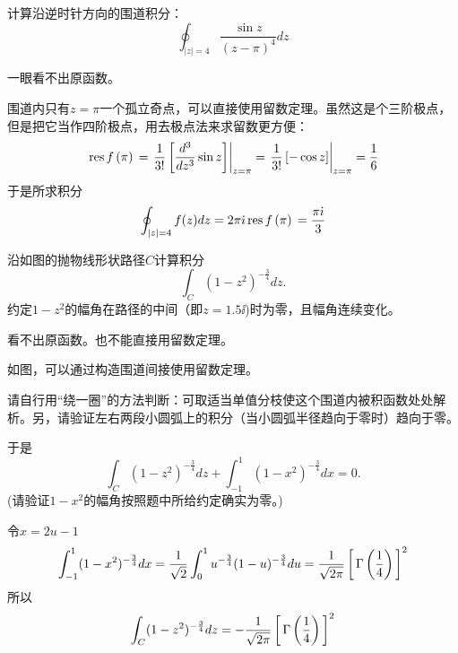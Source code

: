 \documentclass[CJK]{beamer}
\begin{document}

\begin{frame}
\chtitle{\proid (\stwo)}
\bch
计算沿逆时针方向的围道积分：
$$\oint_{|z|=4}\frac{\sin z}{(z-\pi)^4}dz$$
\ech
\end{frame}

\begin{frame}
\bch
一眼看不出原函数。

围道内只有$z=\pi$一个孤立奇点，可以直接使用留数定理。虽然这是个三阶极点，但是把它当作四阶极点，用去极点法来求留数更方便：
$$\,\mathrm{res}\,f\left(\pi\right)\, = \left.\frac{1}{3!}\left[\frac{d^3}{dz^3} \sin z\right] \right\vert_{z=\pi} = \left.\frac{1}{3!}\left[-\cos z\right] \right\vert_{z=\pi} = \frac{1}{6} $$
于是所求积分
$$\oint_{|z|=4}f(z) dz = 2\pi{\dot{\imath}} \,\mathrm{res}\,f\left(\pi\right)\, = \frac{\pi {\dot{\imath}}}{3}$$

\ech
\end{frame}

\begin{frame}
\chtitle{\proid (\sthree)}
\bch
{}

沿如图的抛物线形状路径$C$计算积分
$$\int_C (1-z^2)^{-\frac{3}{4}} dz. $$
约定$1-z^2$的幅角在路径的中间（即$z=1.5\ii$)时为零，且幅角连续变化。
\ech
\end{frame}


\begin{frame}
\bch

看不出原函数。也不能直接用留数定理。


如图，可以通过构造围道间接使用留数定理。

请自行用“绕一圈”的方法判断：可取适当单值分枝使这个围道内被积函数处处解析。另，请验证左右两段小圆弧上的积分（当小圆弧半径趋向于零时）趋向于零。


\ech
\end{frame}

\begin{frame}
\bch
于是
$$\int_C (1-z^2)^{-\frac{3}{4}} dz + \int_{-1}^1(1-x^2)^{-\frac{3}{4}} dx = 0.$$
{\small (请验证$1-x^2$的幅角按照题中所给约定确实为零。)}

令$x=2u-1$
$$\int_{-1}^1(1-x^2)^{-\frac{3}{4}} dx= \frac{1}{\sqrt{2}}\int_0^1u^{-\frac{3}{4}}(1-u)^{-\frac{3}{4}} du = \frac{1}{\sqrt{2\pi}} \left[\,\Gamma\left( \frac{1}{4} \right)\,\right]^2 $$
所以
$$\int_C (1-z^2)^{-\frac{3}{4}} dz = -\frac{1}{\sqrt{2\pi}} \left[\,\Gamma\left( \frac{1}{4} \right)\,\right]^2$$
\ech
\end{frame}
\end{document}
